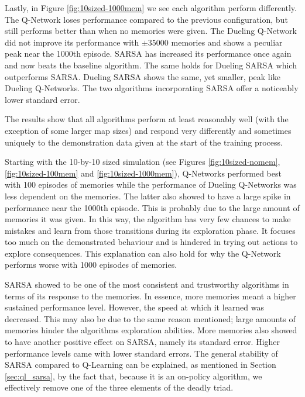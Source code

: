 Lastly, in Figure \ref{fig:10sized-1000mem} we see each algorithm perform differently. The Q-Network loses performance compared to the previous configuration, but still performs better than when no memories were given. The Dueling Q-Network did not improve its performance with $\pm 35000$ memories and shows a peculiar peak near the 1000th episode. SARSA has increased its performance once again and now beats the baseline algorithm. The same holds for Dueling SARSA which outperforms SARSA. Dueling SARSA shows the same, yet smaller, peak like Dueling Q-Networks. The two algorithms incorporating SARSA offer a noticeably lower standard error.

The results show that all algorithms perform at least reasonably well (with the exception of some larger map sizes) and respond very differently and sometimes uniquely to the demonstration data given at the start of the training process. 

Starting with the 10-by-10 sized simulation (see Figures \ref{fig:10sized-nomem}, \ref{fig:10sized-100mem} and \ref{fig:10sized-1000mem}), Q-Networks performed best with 100 episodes of memories while the performance of Dueling Q-Networks was less dependent on the memories. The latter also showed to have a large spike in performance near the 1000th episode. This is probably due to the large amount of memories it was given. In this way, the algorithm has very few chances to make mistakes and learn from those transitions during its exploration phase. It focuses too much on the demonstrated behaviour and is hindered in trying out actions to explore consequences. This explanation can also hold for why the Q-Network performs worse with 1000 episodes of memories.

SARSA showed to be one of the most consistent and trustworthy algorithms in terms of its response to the memories. In essence, more memories meant a higher sustained performance level. However, the speed at which it learned was decreased. This may also be due to the same reason mentioned; large amounts of memories hinder the algorithms exploration abilities. More memories also showed to have another positive effect on SARSA, namely its standard error. Higher performance levels came with lower standard errors. The general stability of SARSA compared to Q-Learning can be explained, as mentioned in Section \ref{sec:ql_sarsa}, by the fact that, because it is an on-policy algorithm, we effectively remove one of the three elements of the deadly triad. 

